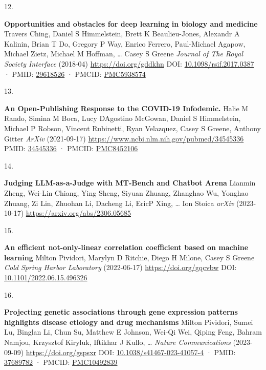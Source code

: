 \documentclass[
]{article}
\newlength{\cslhangindent}
\newlength{\csllabelwidth}
\newlength{\cslentryspacingunit} %
\newenvironment{CSLReferences}[2] %
 {%
  \setlength{\parindent}{0pt}
  \ifodd #1
  \let\oldpar\par
  \def\par{\hangindent=\cslhangindent\oldpar}
  \fi
  \setlength{\parskip}{#2\cslentryspacingunit}
 }%
 {}
\newcommand{\CSLBlock}[1]{#1\hfill\break}
\newcommand{\CSLLeftMargin}[1]{\parbox[t]{\csllabelwidth}{#1}}
\newcommand{\CSLRightInline}[1]{\parbox[t]{\linewidth - \csllabelwidth}{#1}\break}
\begin{document}
\begin{CSLReferences}{0}{0}
\leavevmode{}%
\CSLLeftMargin{12. }%
\CSLRightInline{\textbf{Opportunities and obstacles for deep learning in biology and medicine}
\CSLBlock{Travers Ching, Daniel S Himmelstein, Brett K Beaulieu-Jones, Alexandr A Kalinin, Brian T Do, Gregory P Way, Enrico Ferrero, Paul-Michael Agapow, Michael Zietz, Michael M Hoffman, \ldots{} Casey S Greene} \emph{Journal of The Royal Society Interface} (2018-04) \url{https://doi.org/gddkhn}
\CSLBlock{DOI: \href{https://doi.org/10.1098/rsif.2017.0387}{10.1098/rsif.2017.0387} · PMID: \href{https://www.ncbi.nlm.nih.gov/pubmed/29618526}{29618526} · PMCID: \href{https://www.ncbi.nlm.nih.gov/pmc/articles/PMC5938574}{PMC5938574}}}

\leavevmode{}%
\CSLLeftMargin{13. }%
\CSLRightInline{\textbf{An Open-Publishing Response to the COVID-19 Infodemic.}
\CSLBlock{Halie M Rando, Simina M Boca, Lucy D\textquotesingle Agostino McGowan, Daniel S Himmelstein, Michael P Robson, Vincent Rubinetti, Ryan Velazquez, Casey S Greene, Anthony Gitter} \emph{ArXiv} (2021-09-17) \url{https://www.ncbi.nlm.nih.gov/pubmed/34545336}
\CSLBlock{PMID: \href{https://www.ncbi.nlm.nih.gov/pubmed/34545336}{34545336} · PMCID: \href{https://www.ncbi.nlm.nih.gov/pmc/articles/PMC8452106}{PMC8452106}}}

\leavevmode{}%
\CSLLeftMargin{14. }%
\CSLRightInline{\textbf{Judging LLM-as-a-Judge with MT-Bench and Chatbot Arena}
\CSLBlock{Lianmin Zheng, Wei-Lin Chiang, Ying Sheng, Siyuan Zhuang, Zhanghao Wu, Yonghao Zhuang, Zi Lin, Zhuohan Li, Dacheng Li, EricP Xing, \ldots{} Ion Stoica} \emph{arXiv} (2023-10-17) \url{https://arxiv.org/abs/2306.05685}}

\leavevmode{}%
\CSLLeftMargin{15. }%
\CSLRightInline{\textbf{An efficient not-only-linear correlation coefficient based on machine learning}
\CSLBlock{Milton Pividori, Marylyn D Ritchie, Diego H Milone, Casey S Greene} \emph{Cold Spring Harbor Laboratory} (2022-06-17) \url{https://doi.org/gqcvbw}
\CSLBlock{DOI: \href{https://doi.org/10.1101/2022.06.15.496326}{10.1101/2022.06.15.496326}}}

\leavevmode{}%
\CSLLeftMargin{16. }%
\CSLRightInline{\textbf{Projecting genetic associations through gene expression patterns highlights disease etiology and drug mechanisms}
\CSLBlock{Milton Pividori, Sumei Lu, Binglan Li, Chun Su, Matthew E Johnson, Wei-Qi Wei, Qiping Feng, Bahram Namjou, Krzysztof Kiryluk, Iftikhar J Kullo, \ldots{} } \emph{Nature Communications} (2023-09-09) \url{https://doi.org/gspsxr}
\CSLBlock{DOI: \href{https://doi.org/10.1038/s41467-023-41057-4}{10.1038/s41467-023-41057-4} · PMID: \href{https://www.ncbi.nlm.nih.gov/pubmed/37689782}{37689782} · PMCID: \href{https://www.ncbi.nlm.nih.gov/pmc/articles/PMC10492839}{PMC10492839}}}


\end{CSLReferences}
\end{document}
